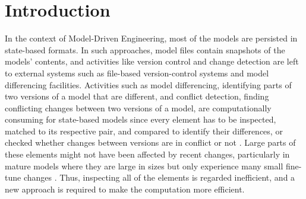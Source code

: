 \section{Introduction}
\label{sec:introduction}
In the context of Model-Driven Engineering, most of the models are persisted in state-based formats. In such approaches, model files contain snapshots of the models' contents, and activities like version control and change detection are left to external systems such as file-based version-control systems and model differencing facilities. Activities such as model differencing, identifying parts of two versions of a model that are different, and conflict detection, finding conflicting changes between two versions of a model, are computationally consuming for state-based models \cite{Kolovos:2009:DMM:1564596.1564641} since every element has to be inspected, matched to its respective pair, and compared to identify their differences, or checked whether changes between versions are in conflict or  not \cite{emfcompare2018developer}. Large parts of these elements might not have been affected by recent changes, particularly in mature models where they are large in sizes but only experience many small fine-tune changes \cite{selic2003pragmatics}. Thus, inspecting all of the elements is regarded inefficient, and a new approach is required to make the computation more efficient.

